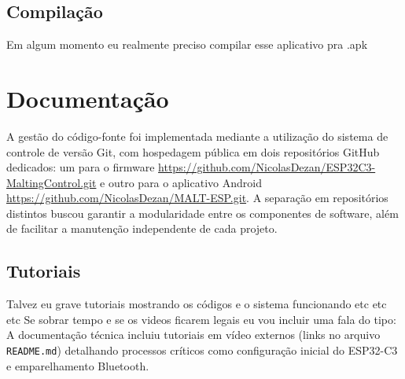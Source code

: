 \subsection{Compilação}

Em algum momento eu realmente preciso compilar esse aplicativo pra .apk



\section{Documentação}
A gestão do código-fonte foi implementada mediante a utilização do sistema de controle de versão Git, com hospedagem pública em dois repositórios GitHub dedicados: um para o firmware \url{https://github.com/NicolasDezan/ESP32C3-MaltingControl.git} e outro para o aplicativo Android \url{https://github.com/NicolasDezan/MALT-ESP.git}. A separação em repositórios distintos buscou garantir a modularidade entre os componentes de software, além de facilitar a manutenção independente de cada projeto.

\subsection{Tutoriais}
Talvez eu grave tutoriais mostrando os códigos e o sistema funcionando etc etc etc
Se sobrar tempo e se os videos ficarem legais eu vou incluir uma fala do tipo:
A documentação técnica incluiu tutoriais em vídeo externos (links no arquivo \texttt{README.md}) detalhando processos críticos como configuração inicial do ESP32-C3 e emparelhamento Bluetooth.